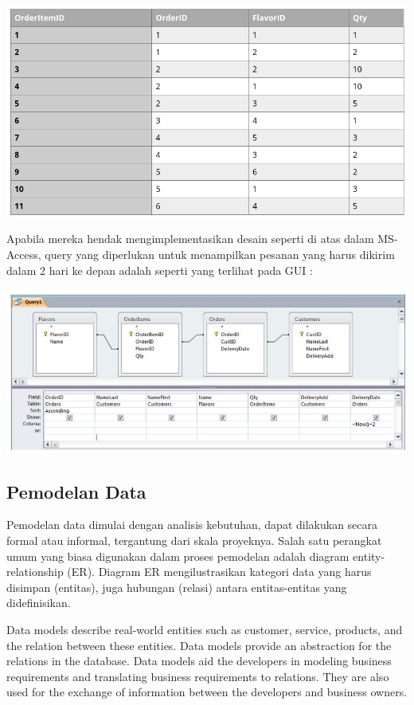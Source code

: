 \documentclass[]{book}
\begin{document}
\includegraphics{./img/tab7_order.png}

Apabila mereka hendak mengimplementasikan desain seperti di atas dalam MS-Access, query yang diperlukan untuk menampilkan pesanan yang harus dikirim dalam 2 hari ke depan adalah seperti yang terlihat pada GUI :

\includegraphics{./img/tab8_order.png}

\hypertarget{pemodelan-data}{%
\subsection{Pemodelan Data}\label{pemodelan-data}}

Pemodelan data dimulai dengan analisis kebutuhan, dapat dilakukan secara formal atau informal, tergantung dari skala proyeknya. Salah satu perangkat umum yang biasa digunakan dalam proses pemodelan adalah diagram entity-relationship (ER). Diagram ER mengilustrasikan kategori data yang harus disimpan (entitas), juga hubungan (relasi) antara entitas-entitas yang didefinisikan.

Data models describe real-world entities such as customer, service, products, and the relation between these entities. Data models provide an abstraction for the relations in the database. Data models aid the developers in modeling business requirements and translating business requirements to relations. They are also used for the exchange of information between the developers and business owners.
\end{document}

